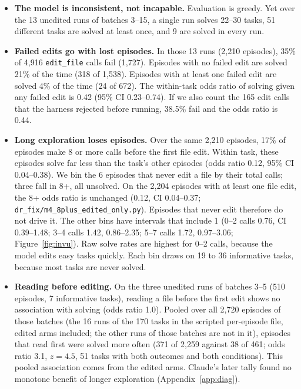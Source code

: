 \begin{itemize}
    \item \textbf{The model is inconsistent, not incapable.} Evaluation is greedy. Yet over the 13 unedited runs of batches 3--15, a single run solves 22--30 tasks, 51 different tasks are solved at least once, and 9 are solved in every run.
    \item \textbf{Failed edits go with lost episodes.} In those 13 runs (2,210 episodes), 35\% of 4,916 \texttt{edit\_file} calls fail (1,727). Episodes with no failed edit are solved 21\% of the time (318 of 1,538). Episodes with at least one failed edit are solved 4\% of the time (24 of 672). The within-task odds ratio of solving given any failed edit is 0.42 (95\% CI 0.23--0.74). If we also count the 165 edit calls that the harness rejected before running, 38.5\% fail and the odds ratio is 0.44.
    \item \textbf{Long exploration loses episodes.} Over the same 2,210 episodes, 17\% of episodes make 8 or more calls before the first file edit. Within task, these episodes solve far less than the task's other episodes (odds ratio 0.12, 95\% CI 0.04--0.38). We bin the 6 episodes that never edit a file by their total calls; three fall in 8+, all unsolved. On the 2,204 episodes with at least one file edit, the 8+ odds ratio is unchanged (0.12, CI 0.04--0.37; \texttt{dr\_fix/m4\_8plus\_edited\_only.py}). Episodes that never edit therefore do not drive it. The other bins have intervals that include 1 (0--2 calls 0.76, CI 0.39--1.48; 3--4 calls 1.42, 0.86--2.35; 5--7 calls 1.72, 0.97--3.06; Figure~\ref{fig:invu}). Raw solve rates are highest for 0--2 calls, because the model edits easy tasks quickly. Each bin draws on 19 to 36 informative tasks, because most tasks are never solved.
    \item \textbf{Reading before editing.} On the three unedited runs of batches 3--5 (510 episodes, 7 informative tasks), reading a file before the first edit shows no association with solving (odds ratio 1.0). Pooled over all 2,720 episodes of those batches (the 16 runs of the 170 tasks in the scripted per-episode file, edited arms included; the other runs of those batches are not in it), episodes that read first were solved more often (371 of 2,259 against 38 of 461; odds ratio 3.1, $z = 4.5$, 51 tasks with both outcomes and both conditions). This pooled association comes from the edited arms. Claude's later tally found no monotone benefit of longer exploration (Appendix~\ref{app:diag}).
\end{itemize}

